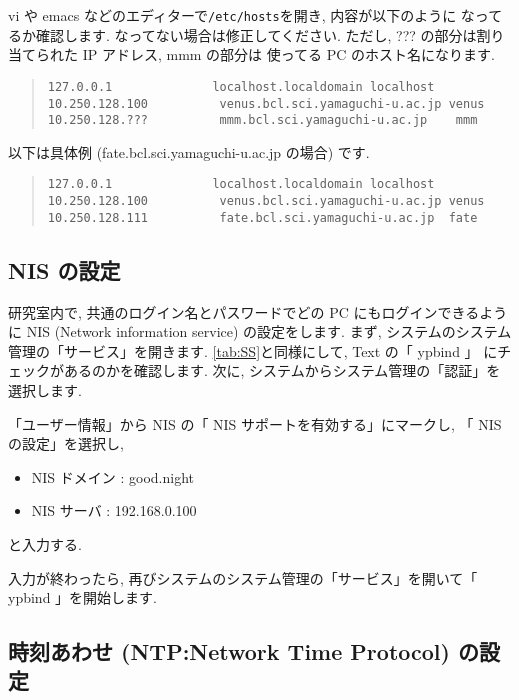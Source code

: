 \documentclass{jarticle}
\begin{document}
vi や emacs などのエディターで\verb|/etc/hosts|を開き, 内容が以下のように
なってるか確認します. なってない場合は修正してください.
ただし, ??? の部分は割り当てられた IP アドレス, mmm の部分は
使ってる PC のホスト名になります.
\begin{quote}
\begin{verbatim}
127.0.0.1              localhost.localdomain localhost
10.250.128.100          venus.bcl.sci.yamaguchi-u.ac.jp venus
10.250.128.???          mmm.bcl.sci.yamaguchi-u.ac.jp    mmm
\end{verbatim}
\end{quote}
以下は具体例 (fate.bcl.sci.yamaguchi-u.ac.jp の場合) です.
\begin{quote}
\begin{verbatim}
127.0.0.1              localhost.localdomain localhost
10.250.128.100          venus.bcl.sci.yamaguchi-u.ac.jp venus
10.250.128.111          fate.bcl.sci.yamaguchi-u.ac.jp  fate
\end{verbatim}
\end{quote}



\subsection{NIS の設定}
研究室内で, 共通のログイン名とパスワードでどの PC にもログインできるよう
に NIS (Network information service) の設定をします.
まず, システムのシステム管理の「サービス」を開きます. \ref{tab:SS}と同様にして, Text の「 ypbind 」
にチェックがあるのかを確認します.
次に, システムからシステム管理の「認証」を選択します.

「ユーザー情報」から NIS の「 NIS サポートを有効する」にマークし, 「 NIS の設定」を選択し,
\begin{itemize}
	\item NIS ドメイン : good.night
	\item NIS サーバ : 192.168.0.100
\end{itemize}
と入力する.

入力が終わったら, 再びシステムのシステム管理の「サービス」を開いて「 ypbind 」を開始します.



\subsection{時刻あわせ (NTP:Network Time Protocol) の設定}
\end{document}
